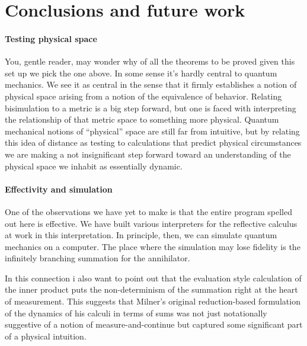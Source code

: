 \section{Conclusions and future work}

\paragraph{Testing physical space}
You, gentle reader, may wonder why of all the theorems to be proved
given this set up we pick the one above. In some sense it's hardly
central to quantum mechanics. We see it as central in the sense that
it firmly establishes a notion of physical space arising from a notion
of the equivalence of behavior. Relating bisimulation to a metric is a
big step forward, but one is faced with interpreting the relationship
of that metric space to something more physical. Quantum mechanical
notions of ``physical'' space are still far from intuitive, but by
relating this idea of distance as testing to calculations that predict
physical circumstances we are making a not insignificant step forward
toward an understanding of the physical space we inhabit as
essentially dynamic.

\paragraph{Effectivity and simulation}
One of the observations we have yet to make is that the entire program
spelled out here is effective. We have built various interpreters for
the reflective calculus at work in this interpretation. In principle,
then, we can simulate quantum mechanics on a computer. The place where
the simulation may lose fidelity is the infinitely branching summation
for the annihilator.

In this connection i also want to point out that the evaluation style
calculation of the inner product puts the non-determinism of the
summation right at the heart of measurement. This suggests that
Milner's original reduction-based formulation of the dynamics of his
calculi in terms of sums was not just notationally suggestive of a
notion of measure-and-continue but captured some significant part of a
physical intuition.


